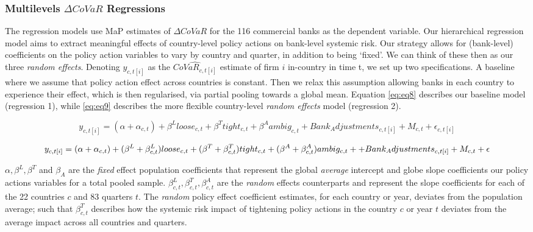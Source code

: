 \documentclass[
  10pt,
]{article}
\begin{document}
\hypertarget{multilevels-delta-covar-regressions}{%
\subsubsection{\texorpdfstring{Multilevels \(\Delta CoVaR\)
Regressions}{Multilevels \textbackslash Delta CoVaR Regressions}}\label{multilevels-delta-covar-regressions}}

The regression models use MaP estimates of \(\Delta CoVaR\) for the 116
commercial banks as the dependent variable. Our hierarchical regression
model aims to extract meaningful effects of country-level policy actions
on bank-level systemic risk. Our strategy allows for (bank-level)
coefficients on the policy action variables to vary by country and
quarter, in addition to being `fixed'. We can think of these then as our
three \emph{random effects}. Denoting \(y_{c,t[i]}\) as the
\(\widehat{CoVaR_{c,t[i]}}\) estimate of firm \(i\) in-country in time
t, we set up two specifications. A baseline where we assume that policy
action effect across countries is constant. Then we relax this
assumption allowing banks in each country to experience their effect,
which is then regularised, via partial pooling towards a global mean.
Equation \ref{eq:eq8} describes our baseline model (regression 1), while
\ref{eq:eq9} describes the more flexible country-level \emph{random
effects} model (regression 2).

\begin{equation}\label{eq:eq8}
 y_{c,t[i]} = (\alpha + \alpha_{c,t}) + \beta^L loose_{c,t}+\beta^T tight_{c,t}+\beta^A ambig_{c,t}+Bank_Adjustments_{c,t[i]}+M_{c,t}+\epsilon_{c,t[i]}
\end{equation}

\begin{equation}\label{eq:eq9}
y_{c,t[i]} = (\alpha + \alpha_{c,t}) + (\beta^L+\beta^L_{c,t})loose_{c,t}+(\beta^T+\beta^T_{c,t})tight_{c,t} \\
  +(\beta^A+\beta^A_{c,t})ambig_{c,t}++Bank_Adjustments_{c,t[i]}+M_{c,t}+\epsilon
\end{equation}

\(\alpha, \beta^L, \beta^T\) and \(\beta_A\) are the \emph{fixed} effect
population coefficients that represent the global \emph{average}
intercept and globe slope coefficients our policy actions variables for
a total pooled sample. \(\beta^L_{c,t},\beta^T_{c,t},\beta^A_{c,t}\) are
the \emph{random} effects counterparts and represent the slope
coefficients for each of the 22 countries \(c\) and 83 quarters \(t\).
The \emph{random} policy effect coefficient estimates, for each country
or year, deviates from the population average; such that
\(\beta^T_{c,t}\) describes how the systemic risk impact of tightening
policy actions in the country \(c\) or year \(t\) deviates from the
average impact across all countries and quarters.
\end{document}
